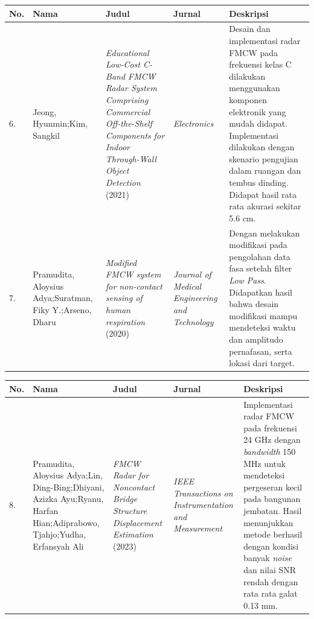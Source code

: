 \begin{center}
	\vspace{6cm}

	\begin{longtable}{|p{0.5cm}|p{2cm}|p{3cm}|p{2.5cm}|p{4cm}|}
	\hline
	\textbf{No.} & \textbf{Nama} & \textbf{Judul} &\textbf{Jurnal} & \textbf{Deskripsi}\\
	\hline
	6. & Jeong, Hyunmin;\newline Kim, Sangkil
	& \textit{Educational Low-Cost C-Band FMCW Radar System Comprising Commercial Off-the-Shelf Components for Indoor Through-Wall Object Detection} (2021)
	& \textit{Electronics}
	& Desain dan implementasi radar FMCW pada frekuensi kelas C dilakukan menggunakan komponen elektronik yang mudah didapat. Implementasi dilakukan dengan skenario pengujian dalam ruangan dan tembus dinding. Didapat hasil rata rata akurasi sekitar 5.6 cm. \\ \hline
	
	7. & Pramudita, Aloysius Adya;\newline Suratman, Fiky Y.;\newline Arseno, Dharu
	& \textit{Modified FMCW system for non-contact sensing of human respiration} (2020)
	& \textit{Journal of Medical Engineering and Technology}
	& Dengan melakukan modifikasi pada pengolahan data fasa setelah filter \textit{Low Pass}. Didapatkan hasil bahwa desain modifikasi mampu mendeteksi waktu dan amplitudo pernafasan, serta lokasi dari target. 
	\\ \hline
	\end{longtable}

	\vspace{7cm}

	\begin{longtable}{|p{0.5cm}|p{2cm}|p{3cm}|p{2.5cm}|p{4cm}|}
	\hline
	\textbf{No.} & \textbf{Nama} & \textbf{Judul} &\textbf{Jurnal} & \textbf{Deskripsi}\\
	\hline
	8. & Pramudita, Aloysius Adya;\newline Lin, Ding-Bing;\newline Dhiyani, Azizka Ayu;\newline Ryanu, Harfan Hian;\newline Adiprabowo, Tjahjo;\newline Yudha, Erfansyah Ali
	& \textit{FMCW Radar for Noncontact Bridge Structure Displacement Estimation} (2023)
	& \textit{IEEE Transactions on Instrumentation and Measurement}
	& Implementasi radar FMCW pada frekuensi 24 GHz dengan \textit{bandwidth} 150 MHz untuk mendeteksi pergeseran kecil pada bangunan jembatan. Hasil menunjukkan metode berhasil dengan kondisi banyak \textit{noise} dan nilai SNR rendah dengan rata rata galat 0.13 mm.
	\\ \hline
	

\end{longtable}
\end{center}
